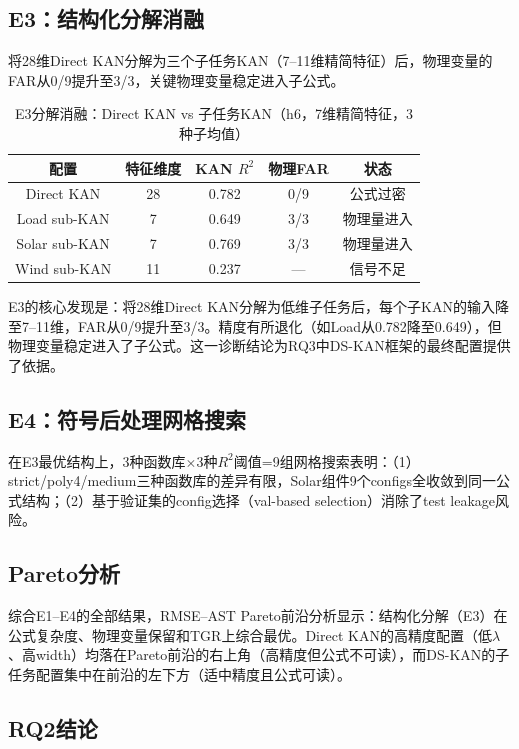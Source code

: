 \documentclass[12pt,a4paper,oneside]{ctexbook}
\begin{document}
\subsection{E3：结构化分解消融}

将28维Direct KAN分解为三个子任务KAN（7--11维精简特征）后，物理变量的FAR从0/9提升至3/3，关键物理变量稳定进入子公式。

\begin{table}[htbp]
\centering
\caption{E3分解消融：Direct KAN vs 子任务KAN（h6，7维精简特征，3种子均值）}
\label{tab:e3-results}
\begin{tabular}{ccccc}
\toprule
配置 & 特征维度 & KAN $R^2$ & 物理FAR & 状态 \\
\midrule
Direct KAN & 28 & 0.782 & 0/9 & 公式过密 \\
Load sub-KAN & 7 & 0.649 & 3/3 & 物理量进入 \\
Solar sub-KAN & 7 & 0.769 & 3/3 & 物理量进入 \\
Wind sub-KAN & 11 & 0.237 & — & 信号不足 \\
\bottomrule
\end{tabular}
\end{table}

E3的核心发现是：将28维Direct KAN分解为低维子任务后，每个子KAN的输入降至7--11维，FAR从0/9提升至3/3。精度有所退化（如Load从0.782降至0.649），但物理变量稳定进入了子公式。这一诊断结论为RQ3中DS-KAN框架的最终配置提供了依据。

\subsection{E4：符号后处理网格搜索}

在E3最优结构上，3种函数库$\times$3种$R^2$阈值=9组网格搜索表明：（1）strict/poly4/medium三种函数库的差异有限，Solar组件9个configs全收敛到同一公式结构；（2）基于验证集的config选择（val-based selection）消除了test leakage风险。

\subsection{Pareto分析}

综合E1--E4的全部结果，RMSE--AST Pareto前沿分析显示：结构化分解（E3）在公式复杂度、物理变量保留和TGR上综合最优。Direct KAN的高精度配置（低$\lambda$、高width）均落在Pareto前沿的右上角（高精度但公式不可读），而DS-KAN的子任务配置集中在前沿的左下方（适中精度且公式可读）。

\subsection{RQ2结论}
\end{document}
